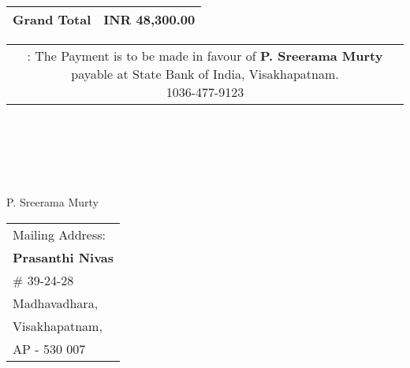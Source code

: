 \documentclass[11pt]{article}
\begin{document}
\vspace*{0.45cm}

\hspace*{11.9cm}
\begin{tabular}{|c|r|}
\hline
{\bf Grand Total} & INR 48,300.00 \\
\hline
\end{tabular}

\vspace*{-0.45cm}
\hspace*{-0.65cm}
\begin{tabular}{c}
\parbox{4in}{ : The Payment is to be made in favour of {\bf P. Sreerama Murty} payable at State Bank of India, Visakhapatnam. \\
 1036-477-9123}\\
\end{tabular}
\vspace*{75pt}


 \\ \\ \\ \\ \\
 \hspace*{0.2cm}P. Sreerama Murty
\vspace*{-71pt}
\begin{flushright}
\begin{tabular}{l}
Mailing Address:\\
{\bf Prasanthi Nivas}\\
\# 39-24-28\\
Madhavadhara, \\ 
Visakhapatnam, \\
AP - 530 007\\
\end{tabular}
\end{flushright}
\end{document}
